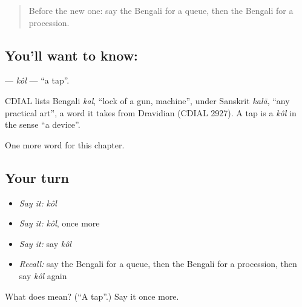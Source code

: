 \label{lesson:BN-C170-kol}



\begin{quote}
Before the new one: say the Bengali for a queue, then the Bengali for a procession.
\end{quote}

\subsection*{You'll want to know: }
\textbf{} — \emph{kôl} — \textquotedblleft{}a tap\textquotedblright{}.

\begin{cousinweb}
CDIAL lists Bengali \emph{kal}, \textquotedblleft{}lock of a gun, machine\textquotedblright{}, under Sanskrit \emph{kalā}, \textquotedblleft{}any practical art\textquotedblright{}, a word it takes from Dravidian (CDIAL 2927). A tap is a \emph{kôl} in the sense \textquotedblleft{}a device\textquotedblright{}.
\end{cousinweb}

\begin{grammarlens}[title={What you've built}]
One more word for this chapter.
\end{grammarlens}

\subsection*{Your turn}
\begin{itemize}
\raggedright
  \item \emph{Say it:} \emph{kôl}
  \item \emph{Say it:} \emph{kôl}, once more
  \item \emph{Say it:} say \emph{kôl}
  \item \emph{Recall:} say the Bengali for a queue, then the Bengali for a procession, then say \emph{kôl} again
\end{itemize}

\begin{tcolorbox}[breakable,colback=teal!4,colframe=teal!35!black,title={Before you move on}]
What does  mean? (\textquotedblleft{}A tap\textquotedblright{}.) Say it once more.
\end{tcolorbox}
